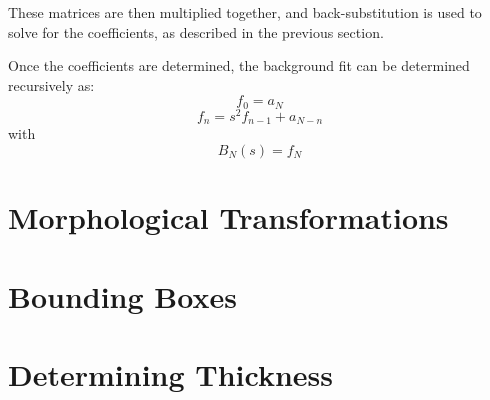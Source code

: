 \documentclass{article}
\begin{document}
These matrices are then multiplied together, and back-substitution is used to solve for the coefficients, as described in the previous section. 

Once the coefficients are determined, the background fit can be determined recursively as:
\[f_0=a_N\]
\[f_{n} =s^2f_{n-1} +a_{N-n}\]
with
\[B_N(s)=f_N\]


\section{Morphological Transformations}
\section{Bounding Boxes}
\section{Determining Thickness}
\end{document}
